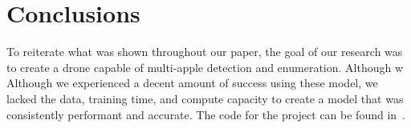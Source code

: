 \section{Conclusions}
To reiterate what was shown throughout our paper, the goal of our research was to create a drone capable of multi-apple detection and enumeration.
Although w
Although we experienced a decent amount of success using these model, we lacked the data, training time, and compute capacity to create a model that was consistently performant and accurate.
The code for the project can be found in~\cite{FruitFly}.
